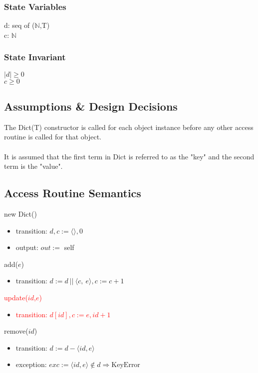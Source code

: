 \documentclass[12pt, titlepage]{article}
\begin{document}
\subsubsection*{State Variables}
d: seq of ($\mathbb{N}$,T) \\
c: $\mathbb{N}$

\subsubsection*{State Invariant}
$|d| \geq 0$\\
$c \geq 0$

\subsection*{Assumptions \& Design Decisions}
The Dict(T) constructor is called for each object instance before any other access routine is called for that object.\\ \\
It is assumed that the first term in Dict is referred to as the "key" and the second term is the "value".


\subsection*{Access Routine Semantics}
\noindent new Dict()
\begin{itemize}
    \item transition: $d, c := \langle \rangle, 0$
    
    \item output: $out :=$ self
\end{itemize}

\noindent add($e$)
\begin{itemize}
    \item transition: $d :=  d\ ||\ \langle c,\ e \rangle, c := c + 1$
\end{itemize}

\noindent\textcolor{red}{update($id$,$e$)}
\begin{itemize}
    \item \textcolor{red}{transition: $d[id],c := e,id+1$}
\end{itemize}

\noindent remove($id$)
\begin{itemize}
    \item transition: $d :=  d - \langle id, e \rangle$
    \item exception: $exc := \langle id, e \rangle \notin d \Rightarrow \text{KeyError}$
\end{itemize}
\end{document}
